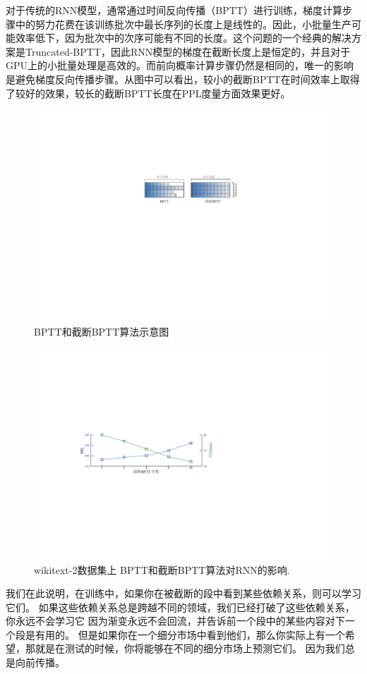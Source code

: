 对于传统的RNN模型，通常通过时间反向传播（BPTT）进行训练，梯度计算步骤中的努力花费在该训练批次中最长序列的长度上是线性的。因此，小批量生产可能效率低下，因为批次中的次序可能有不同的长度。这个问题的一个经典的解决方案是Truncated-BPTT，因此RNN模型的梯度在截断长度上是恒定的，并且对于GPU上的小批量处理是高效的。而前向概率计算步骤仍然是相同的，唯一的影响是避免梯度反向传播步骤。从图中可以看出，较小的截断BPTT在时间效率上取得了较好的效果，较长的截断BPTT长度在PPL度量方面效果更好。
\begin{figure}[!t]
  \centering
  \includegraphics[width=.8\columnwidth]{./figures/minibatch.pdf}
  \caption{BPTT和截断BPTT算法示意图}\label{fig:minibatch}
\end{figure}
\begin{figure}[!t]
  \centering
  \includegraphics[width=.85\columnwidth]{./figures/tbptt.pdf}
  \caption{wikitext-2数据集上 BPTT和截断BPTT算法对RNN的影响.}\label{fig:tbptt}
\end{figure}
我们在此说明，在训练中，如果你在被截断的段中看到某些依赖关系，则可以学习它们。 如果这些依赖关系总是跨越不同的领域，我们已经打破了这些依赖关系，你永远不会学习它 因为渐变永远不会回流，并告诉前一个段中的某些内容对下一个段是有用的。 但是如果你在一个细分市场中看到他们，那么你实际上有一个希望，那就是在测试的时候，你将能够在不同的细分市场上预测它们。 因为我们总是向前传播。


